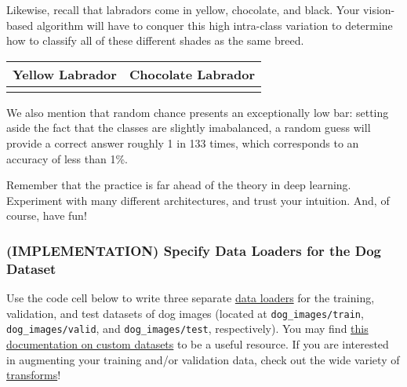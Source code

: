 \documentclass[11pt]{article}
\begin{document}
Likewise, recall that labradors come in yellow, chocolate, and black.
Your vision-based algorithm will have to conquer this high intra-class
variation to determine how to classify all of these different shades as
the same breed.

\begin{longtable}[]{@{}ll@{}}
\toprule
Yellow Labrador & Chocolate Labrador\tabularnewline
\midrule
\endhead
&\tabularnewline
\bottomrule
\end{longtable}

We also mention that random chance presents an exceptionally low bar:
setting aside the fact that the classes are slightly imabalanced, a
random guess will provide a correct answer roughly 1 in 133 times, which
corresponds to an accuracy of less than 1\%.

Remember that the practice is far ahead of the theory in deep learning.
Experiment with many different architectures, and trust your intuition.
And, of course, have fun!

\hypertarget{implementation-specify-data-loaders-for-the-dog-dataset}{%
\subsubsection{(IMPLEMENTATION) Specify Data Loaders for the Dog
Dataset}\label{implementation-specify-data-loaders-for-the-dog-dataset}}

Use the code cell below to write three separate
\href{http://pytorch.org/docs/stable/data.html\#torch.utils.data.DataLoader}{data
loaders} for the training, validation, and test datasets of dog images
(located at \texttt{dog\_images/train}, \texttt{dog\_images/valid}, and
\texttt{dog\_images/test}, respectively). You may find
\href{http://pytorch.org/docs/stable/torchvision/datasets.html}{this
documentation on custom datasets} to be a useful resource. If you are
interested in augmenting your training and/or validation data, check out
the wide variety of
\href{http://pytorch.org/docs/stable/torchvision/transforms.html?highlight=transform}{transforms}!
\end{document}
